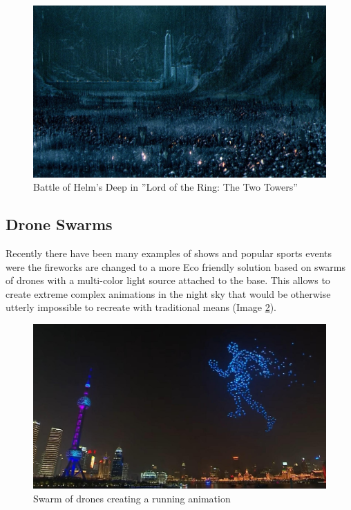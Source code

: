 \documentclass[sigconf]{acmart}
\begin{document}
\begin{figure}[h]
  \centering
  \includegraphics[width=\linewidth]{images/lotr.jpg}
  \caption{Battle of Helm's Deep in ''Lord of the Ring: The Two Towers''}
  \label{fig:lotr}
\end{figure}

\subsection{Drone Swarms}

Recently there have been many examples of shows and popular sports events
were the fireworks are changed to a more  Eco friendly solution based on swarms of drones with a multi-color light source
attached to the base. This allows to create extreme complex animations in the night sky that would be otherwise utterly
impossible to recreate with traditional means (Image \ref{fig:drones}).

\begin{figure}[h]
  \centering
  \includegraphics[width=\linewidth]{images/drone_fireworks.png}
  \caption{Swarm of drones creating a running animation}
  \label{fig:drones}
\end{figure}
\end{document}

